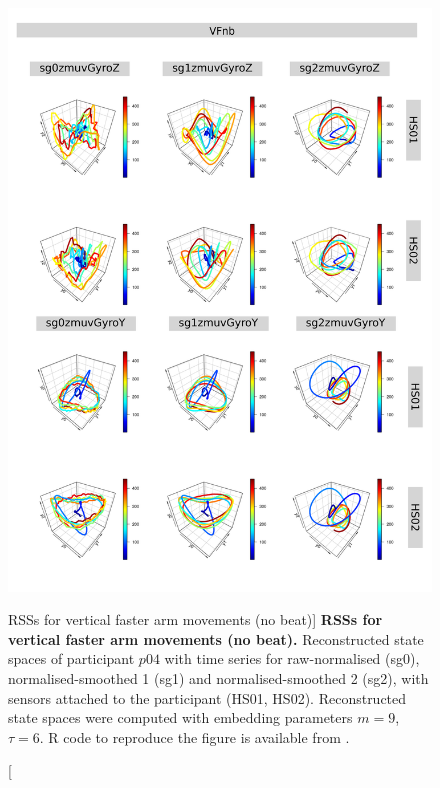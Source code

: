 \begin{figure}
\centering
\includegraphics[height=0.8\textheight]{rss_VFnb_p04}
\caption
	[RSSs for vertical faster arm movements (no beat)]{
	{\bf RSSs for vertical faster arm movements (no beat).}
	Reconstructed state spaces of participant $p04$
	with time series for raw-normalised (sg0), 
	normalised-smoothed 1 (sg1) and 
	normalised-smoothed 2 (sg2), 
	with sensors attached to the participant (HS01, HS02).
	Reconstructed state spaces were computed with 
	embedding parameters $m=9$, $\tau=6$.
	R code to reproduce the figure is available from \cite{hwum2018}.
        }
     \label{fig:rss_VFnb_p04}
\end{figure}



